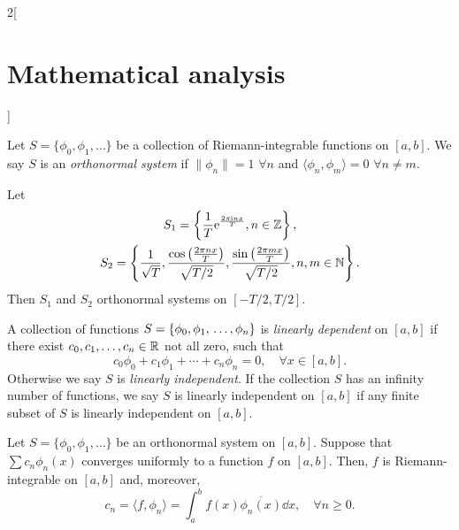 \documentclass[../../../main.tex]{subfiles}
\begin{document}
\begin{multicols}{2}[\section{Mathematical analysis}]
\begin{definition}
\end{definition}
\begin{definition}
Let $S=\{\phi_0,\phi_1,\ldots\}$ be a collection of Riemann-integrable functions on $[a,b]$. We say $S$ is an \textit{orthonormal system} if $\|\phi_n\|=1$ $\forall n$ and $\langle\phi_n,\phi_m\rangle=0$ $\forall n\ne m$.
\end{definition}
\begin{prop}
Let \begin{gather*}
    S_1=\left\{\frac{1}{T}\text{e}^{\frac{2\pi\text{i} nx}{T}},n\in\mathbb{Z} \right\},\\ S_2=\left\{\frac{1}{\sqrt{T}},\frac{\cos\left(\frac{2\pi nx}{T}\right)}{\sqrt{T/2}},\frac{\sin\left(\frac{2\pi mx}{T}\right)}{\sqrt{T/2}},n,m\in\mathbb{N} \right\}.
\end{gather*} Then $S_1$ and $S_2$ orthonormal systems on $[-T/2,T/2]$.
\end{prop}
\begin{definition}
A collection of functions $S=\{\phi_0,\phi_1,\\\ldots,\phi_n\}$ is \textit{linearly dependent} on $[a,b]$ if there exist $c_0,c_1,\ldots,c_n\in\mathbb{R} $ not all zero, such that $$c_0\phi_0+c_1\phi_1+\cdots+c_n\phi_n=0,\quad\forall x\in[a,b].$$ Otherwise we say $S$ is \textit{linearly independent}. If the collection $S$ has an infinity number of functions, we say $S$ is linearly independent on $[a,b]$ if any finite subset of $S$ is linearly independent on $[a,b]$.
\end{definition}
\begin{theorem}
Let $S=\{\phi_0,\phi_1,\ldots\}$ be an orthonormal system on $[a,b]$. Suppose that $\sum c_n\phi_n(x)$ converges uniformly to a function $f$ on $[a,b]$. Then, $f$ is Riemann-integrable on $[a,b]$ and, moreover, $$c_n=\langle f,\phi_n\rangle=\int_a^bf(x)\overline{\phi_n(x)}\dd x,\quad\forall n\geq 0.$$
\end{theorem}

\end{multicols}
\end{document}
